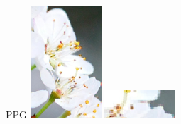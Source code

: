 \begin{figure}[H]
\begin{minipage}{0.19\textwidth}
    \end{minipage}
    \hfill
    \begin{minipage}{0.19\textwidth}
        \centering
        PPG 
        \includegraphics[width=\textwidth]{img/flower/flower-ppg.png}
        \includegraphics[width=\textwidth]{img/flower/flower-close-ppg.png}

\end{minipage}
\end{figure}
